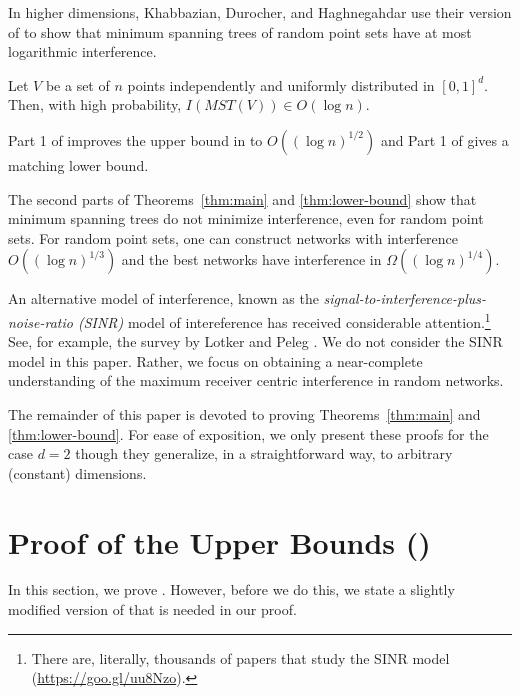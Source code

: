 \documentclass{patmorin}
\newcommand{\mst}{\mathit{MST}}
\begin{document}
In higher dimensions, Khabbazian, Durocher, and Haghnegahdar \cite{kdhk15}
use their version of  to show that minimum spanning trees
of random point sets have at most logarithmic interference.
\begin{thm}
  Let $V$ be a set of $n$ points independently and uniformly distributed
  in $[0,1]^d$.  Then, with high probability, $I(\mst(V))\in O(\log n)$.
\end{thm}
Part 1 of  improves the upper bound in  to
$O((\log n)^{1/2})$ and Part 1 of  gives a matching
lower bound.

The second parts of Theorems~\ref{thm:main} and \ref{thm:lower-bound}
show that minimum spanning trees do not minimize interference, even for
random point sets.  For random point sets, one can construct networks with
interference $O((\log n)^{1/3})$ and the best networks have interference
in $\Omega((\log n)^{1/4})$.

An alternative model of interference, known as the
\emph{signal-to-interference-plus-noise-ratio (SINR)} model of
intereference has received considerable attention.\footnote{There
are, literally, thousands of papers that study the SINR model
(\url{https://goo.gl/uu8Nzo}).}   See, for example, the survey by Lotker
and Peleg \cite{lotker.peleg:structure}.  We do not consider the SINR
model in this paper.  Rather, we focus on obtaining a near-complete
understanding of the maximum receiver centric interference in random
networks.

The remainder of this paper is devoted to proving Theorems~\ref{thm:main}
and \ref{thm:lower-bound}.  For ease of exposition, we only present these
proofs for the case $d=2$ though they generalize, in a straightforward
way, to arbitrary (constant) dimensions.

\section{Proof of the Upper Bounds ()}

In this section, we prove .  However, before we do this,
we state a slightly modified version of  that is needed in
our proof.
\end{document}
